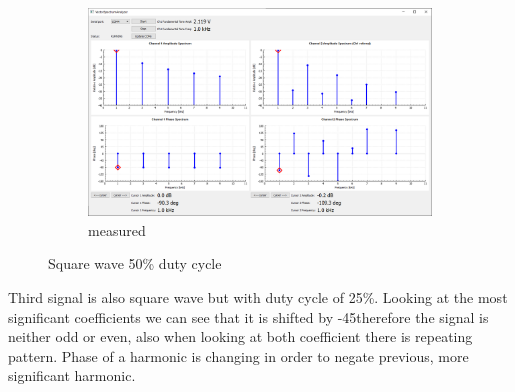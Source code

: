 \documentclass[notitlepage, a4paper, 11pt]{article}
\begin{document}
\begin{figure}[H]
\begin{subfigure}[][][t]{0.28\textwidth}
			\includegraphics[width=\textwidth, trim=10 80 555 100, clip]{../img/Circuit1/dut50}
			\caption{measured}
			\label{fig:meas-signal-b}
		\end{subfigure}
		\caption{Square wave 50\% duty cycle}
		\label{fig:pure-sqr50}
	\end{figure}
	
	Third signal is also square wave but with duty cycle of 25\%. Looking at the most significant coefficients we can see that it is shifted by -45\degree therefore the signal is neither odd or even, also when looking at both coefficient there is repeating pattern. Phase of a harmonic is changing in order to negate previous, more significant harmonic.
	
\end{document}
